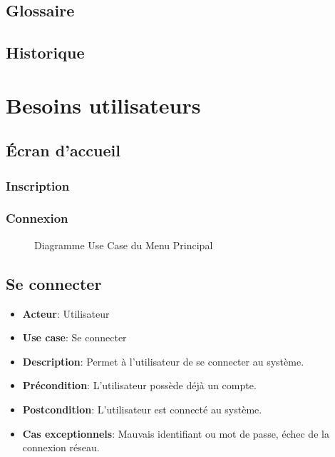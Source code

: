 \documentclass{article}
\begin{document}
\subsection{Glossaire}

\subsection{Historique}

\section{Besoins utilisateurs}

\subsection{Écran d'accueil}

\subsubsection{Inscription}

\subsubsection{Connexion}

\begin{figure}[htbp]
    \centering
    
    \caption{Diagramme Use Case du Menu Principal}
\end{figure}

\subsection*{Se connecter}
\begin{itemize}
    \item \textbf{Acteur}: Utilisateur
    \item \textbf{Use case}: Se connecter
    \item \textbf{Description}: Permet à l'utilisateur de se connecter au système.
    \item \textbf{Précondition}: L'utilisateur possède déjà un compte.
    \item \textbf{Postcondition}: L'utilisateur est connecté au système.
    \item \textbf{Cas exceptionnels}: Mauvais identifiant ou mot de passe, échec de la connexion réseau.
\end{itemize}
\end{document}
